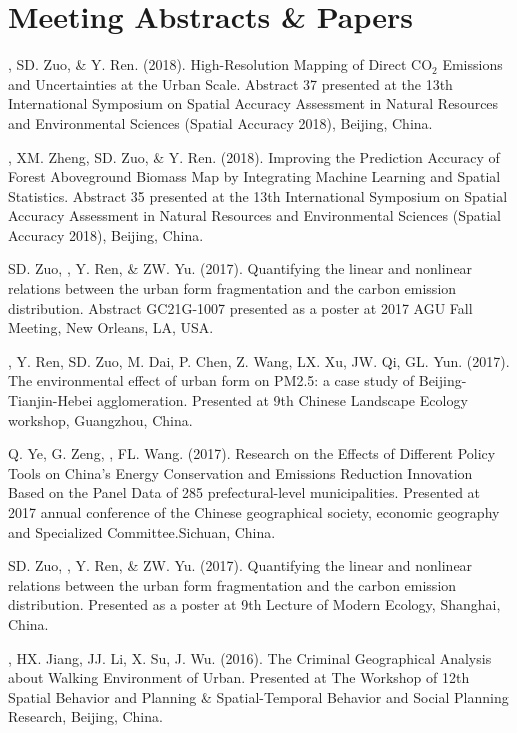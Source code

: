 \section*{Meeting Abstracts \& Papers}
\begin{etaremune}
\item
    \Shaoqing, SD. Zuo, \& Y. Ren. (2018).
    High-Resolution Mapping of Direct CO$_2$ Emissions and Uncertainties at the Urban Scale.
    Abstract 37 presented at the 13th International Symposium on Spatial Accuracy Assessment in Natural Resources and Environmental Sciences (Spatial Accuracy 2018), Beijing, China.
\item
    \Shaoqing\CF, XM. Zheng, SD. Zuo, \& Y. Ren. (2018).
    Improving the Prediction Accuracy of Forest Aboveground Biomass Map by Integrating Machine Learning and Spatial Statistics.
    Abstract 35 presented at the 13th International Symposium on Spatial Accuracy Assessment in Natural Resources and Environmental Sciences (Spatial Accuracy 2018), Beijing, China.
\item
    SD. Zuo, \Shaoqing, Y. Ren, \&  ZW. Yu. (2017).
    Quantifying the linear and nonlinear relations between the urban form fragmentation and the carbon emission distribution.
    Abstract GC21G-1007 presented as a poster at 2017 AGU Fall Meeting, New Orleans, LA, USA.
\item
    \Shaoqing, Y. Ren, SD. Zuo, M. Dai, P. Chen, Z. Wang, LX. Xu, JW. Qi, GL. Yun. (2017).
    The environmental effect of urban form on PM2.5: a case study of Beijing-Tianjin-Hebei agglomeration.
    Presented at 9th Chinese Landscape Ecology workshop, Guangzhou, China.
\item
    Q. Ye, G. Zeng, \Shaoqing, FL. Wang. (2017).
     Research on the Effects of Different Policy Tools on China's Energy Conservation and Emissions Reduction Innovation Based on the Panel Data of 285 prefectural-level municipalities.
     Presented at 2017 annual conference of the Chinese geographical society, economic geography and Specialized Committee.Sichuan, China.
\item
    SD. Zuo, \Shaoqing, Y. Ren, \&  ZW. Yu. (2017).
    Quantifying the linear and nonlinear relations between the urban form fragmentation and the carbon emission distribution.
    Presented as a poster at 9th Lecture of Modern Ecology, Shanghai, China.
\item
    \Shaoqing, HX. Jiang, JJ. Li, X. Su, J. Wu. (2016).
    The Criminal Geographical Analysis about Walking Environment of Urban.
    Presented at The Workshop of 12th Spatial Behavior and Planning \& Spatial-Temporal Behavior and Social Planning Research, Beijing, China.

\end{etaremune}
